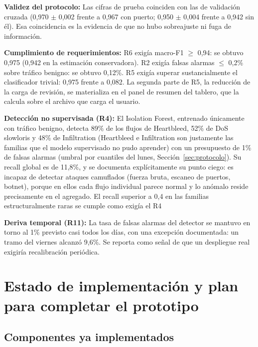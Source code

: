 \documentclass[11pt,a4paper]{article}
\begin{document}
\noindent\textbf{Validez del protocolo:} Las cifras de prueba coinciden con
las de validación cruzada (0,970 $\pm$ 0,002 frente a 0,967 con puerto;
0,950 $\pm$ 0,004 frente a 0,942 sin él). Esa coincidencia es la evidencia de
que no hubo sobreajuste ni fuga de información.

\noindent\textbf{Cumplimiento de requerimientos:} R6 exigía macro-F1
$\geq$ 0,94: se obtuvo 0,975 (0,942 en la estimación conservadora). R2 exigía
falsas alarmas $\leq$ 0,2\% sobre tráfico benigno: se obtuvo 0,12\%. R5
exigía superar sustancialmente el clasificador trivial: 0,975 frente a 0,082.
La segunda parte de R5, la reducción de la carga de revisión, se materializa
en el panel de resumen del tablero, que la calcula sobre el archivo que carga
el usuario.

\noindent\textbf{Detección no supervisada (R4):} El Isolation Forest,
entrenado únicamente con tráfico benigno, detecta 89\% de los flujos de
Heartbleed, 52\% de DoS slowloris y 48\% de Infiltration (Heartbleed e
Infiltration son justamente las familias que el modelo supervisado no pudo
aprender) con un presupuesto de
1\% de falsas alarmas (umbral por cuantiles del lunes, Sección~\ref{sec:protocolo}). Su recall global es de 11,8\%, y se documenta
explícitamente su punto ciego: es incapaz de detectar ataques camuflados
(fuerza bruta, escaneo de puertos, botnet), porque en ellos cada flujo
individual parece normal y lo anómalo reside precisamente en el agregado. El recall
superior a 0,4 en las familias estructuralmente raras se cumple como exigía el R4

\noindent\textbf{Deriva temporal (R11):} La tasa de falsas alarmas del
detector se mantuvo en torno al 1\% previsto casi todos los días, con una
excepción documentada: un tramo del viernes alcanzó 9,6\%. Se reporta como
señal de que un despliegue real exigiría recalibración periódica.

\section{Estado de implementación y plan para completar el prototipo}
\label{sec:plan}

\subsection{Componentes ya implementados}
\end{document}
